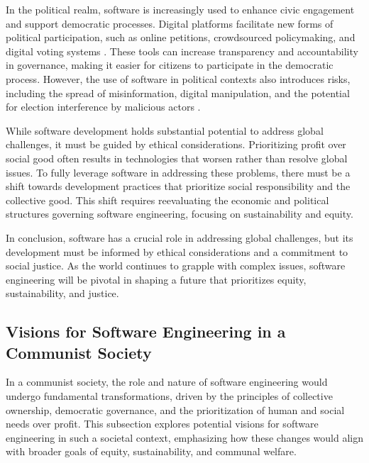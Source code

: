 \begin{refsection}
In the political realm, software is increasingly used to enhance civic engagement and support democratic processes. Digital platforms facilitate new forms of political participation, such as online petitions, crowdsourced policymaking, and digital voting systems \cite[pp.~44-46]{benkler2010wealth}. These tools can increase transparency and accountability in governance, making it easier for citizens to participate in the democratic process. However, the use of software in political contexts also introduces risks, including the spread of misinformation, digital manipulation, and the potential for election interference by malicious actors \cite[pp.~103-106]{mcchesney2015digitaldisconnect}.

While software development holds substantial potential to address global challenges, it must be guided by ethical considerations. Prioritizing profit over social good often results in technologies that worsen rather than resolve global issues. To fully leverage software in addressing these problems, there must be a shift towards development practices that prioritize social responsibility and the collective good. This shift requires reevaluating the economic and political structures governing software engineering, focusing on sustainability and equity.

In conclusion, software has a crucial role in addressing global challenges, but its development must be informed by ethical considerations and a commitment to social justice. As the world continues to grapple with complex issues, software engineering will be pivotal in shaping a future that prioritizes equity, sustainability, and justice.

\subsection{Visions for Software Engineering in a Communist Society}

In a communist society, the role and nature of software engineering would undergo fundamental transformations, driven by the principles of collective ownership, democratic governance, and the prioritization of human and social needs over profit. This subsection explores potential visions for software engineering in such a societal context, emphasizing how these changes would align with broader goals of equity, sustainability, and communal welfare.


\end{refsection}
